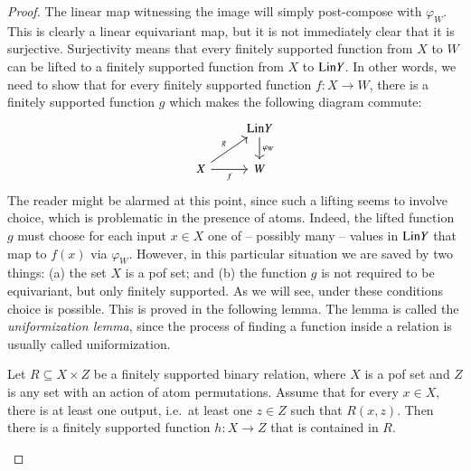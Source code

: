 \begin{proof}
    The linear map witnessing the image will simply post-compose with $\varphi_W$. This is clearly a linear equivariant map, but it is not immediately clear that it is surjective.
    Surjectivity means that every finitely supported function from $X$ to $W$ can be lifted to a finitely supported function from $X$ to $\mathrm{Lin} Y$. In other words, we need to show that 
    for every finitely supported function $f : X \to W$, there is a finitely supported function $g$ which makes the following diagram commute: 
    \begin{equation}
    \label{eq:lifting-to-limcomb}
    \begin{tikzcd}
    & \lincomb Y
    \ar[d,"\varphi_W"]\\
        X 
    \ar[ur,"g"]
    \ar[r,"f"']
    & 
    W
    \end{tikzcd}
    \end{equation}
    The reader might be alarmed at this point, since such a lifting seems to involve choice, which is problematic in the presence of atoms. Indeed, the lifted function  $g$ must choose for each  input $x \in X$ one of -- possibly many -- values in $\mathrm{Lin} Y$ that map to $f(x)$ via $\varphi_W$.  However, in this particular situation we are saved by two things: (a) the set $X$ is a pof set; and (b) the function $g$ is not required to be equivariant, but only finitely supported. As we will see, under these conditions choice is possible.  This is proved in the following lemma. The lemma is called the \emph{uniformization lemma}, since the process of finding a function inside a relation is usually called uniformization. 

    \begin{lemma}\label{lemma:uniformization}
        Let $R \subseteq X \times Z$ be a finitely supported  binary relation, where $X$ is a pof set and $Z$ is any set with an action of atom permutations. Assume that for every $x \in X$, there is at least one output, i.e.~at least one $z \in Z$ such that $R(x,z)$. Then there is a finitely supported function $h : X \to Z$ that is contained in $R$. 
    \end{lemma}


\end{proof}
